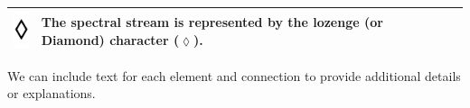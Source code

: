 \begin{longtable}{|m{}|m{}|m{}|}
    \includegraphics[width=0.75\linewidth]{chapters/4-MDC_model_application/image/bvl-spectral.png}
    & 
    The spectral stream is represented by the lozenge (or Diamond) character ($\lozenge$).
    \\\hline
\end{longtable}
We can include text for each element and connection to provide additional details or explanations.
